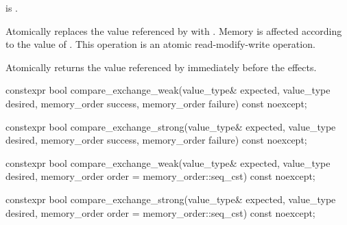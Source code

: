 \begin{itemdescr}
\pnum
\constraints
{} is .

\pnum
\effects
Atomically replaces the value referenced by 
with .
Memory is affected according to the value of .
This operation is an atomic read-modify-write operation.

\pnum
\returns
Atomically returns the value referenced by 
immediately before the effects.
\end{itemdescr}

%
%
%
%
%
%
%
%
\begin{itemdecl}
constexpr bool compare_exchange_weak(value_type& expected, value_type desired,
                                     memory_order success, memory_order failure) const noexcept;

constexpr bool compare_exchange_strong(value_type& expected, value_type desired,
                                       memory_order success, memory_order failure) const noexcept;

constexpr bool compare_exchange_weak(value_type& expected, value_type desired,
                                     memory_order order = memory_order::seq_cst) const noexcept;

constexpr bool compare_exchange_strong(value_type& expected, value_type desired,
                                       memory_order order = memory_order::seq_cst) const noexcept;
\end{itemdecl}

